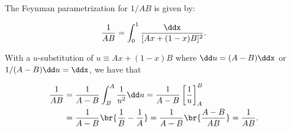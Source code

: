 \section{}

The Feynman parametrization for $1/AB$ is given by:

\begin{equation*}
    \frac{1}{AB} = \int_0^1 \frac{\ddx}{[Ax + (1-x)B]^2}.
\end{equation*}

With a $u$-substitution of $u \equiv Ax + (1-x)B$ where $\dd u = (A-B)\ddx$ or $1/(A-B)\dd u = \ddx$, we have that

\begin{align*}
    \frac{1}{AB} &= \frac{1}{A-B} \int_B^A \frac{1}{u^2} \dd u = \frac{1}{A-B}\left[ \frac{1}{u} \right]^B_A \\
    &= \frac{1}{A-B}\br{\frac{1}{B} - \frac{1}{A}} = \frac{1}{A-B}\br{\frac{A-B}{AB}} = \frac{1}{AB}.
\end{align*}